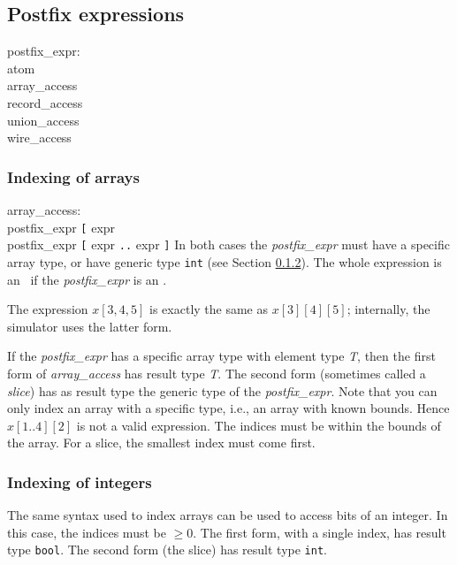 \subsection{Postfix expressions}\label{sec:postfix}

\grammarstart
postfix\_expr: \\
       \>atom \\
\orbox \>array\_access \\
\orbox \>record\_access \\
\orbox \>union\_access \\
\orbox \>wire\_access
\grammarend

\subsubsection{Indexing of arrays}\label{sec:indexing}

\grammarstart
array\_access: \\
       \>postfix\_expr {\tt{}[} expr\LIST {\tt{}]} \\
\orbox \>postfix\_expr {\tt{}[} expr {\tt{}..} expr {\tt{}]}
\grammarend
In both cases the {\it{}postfix\_expr} must have a specific array type, or
have generic type {\tt{}int} (see Section \ref{sec:intindex}). The whole
expression is an \lvalue\ if the {\it{}postfix\_expr} is an \lvalue.

The expression $x[3,4,5]$ is exactly the same as $x[3][4][5]$;
internally, the simulator uses the latter form.

If the {\it{}postfix\_expr} has a specific array type with element type {\it{}T},
then the first
form of {\it{}array\_access} has result type {\it{}T}. The second form (sometimes
called a {\it{}slice}) has as result type the generic type of the
{\it{}postfix\_expr}. Note that you can only index an array with a specific
type, i.e., an array with known bounds. Hence $x[1..4][2]$ is
not a valid expression. The indices must be within the bounds of the
array. For a slice, the smallest index must come first.

\subsubsection{Indexing of integers}\label{sec:intindex}

The same syntax used to index arrays can be used to access bits of
an integer. In this case, the indices must be $\ge 0$. The first form,
with a single index, has result type {\tt{}bool}. The second form (the slice)
has result type {\tt{}int}.

